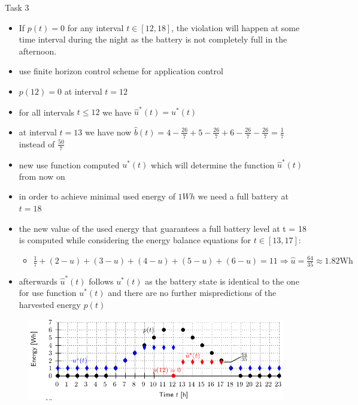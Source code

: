 \begin{frame}[allowframebreaks]{Task 3}{}
\begin{solution}
\begin{itemize}
      \item If $p(t)=0$ for any interval $t \in[12,18]$, the violation will happen at some time interval during the night as the battery is not completely full in the afternoon.
    \end{itemize}
  \end{solution}
  \framebreak
  \begin{tasknoinc}
    \begin{itemize}
      \item use finite horizon control scheme for application control
      \item $p(12) = 0$ at interval $t = 12$
    \end{itemize}
  \end{tasknoinc}
  \begin{solutionnoinc}
    \begin{itemize}
      \item for all intervals $t\le 12$ we have $\hat u^*(t) = u^*(t)$
      \item at interval $t=13$ we have now $\hat b(t)= 4 - \frac{26}{7} + 5 - \frac{26}{7} + 6 - \frac{26}{7} - \frac{26}{7} =\frac{1}{7}$ instead of $\frac{50}{7}$
      \item new use function computed $u^*(t)$ which will determine the function $\hat u^*(t)$ from now on
      \item in order to achieve minimal used energy of $1Wh$ we need a full battery at $t=18$
      \item the new value of the used energy that guarantees a full battery level at t = 18 is computed while considering the energy balance equations for $t\in [13, 17]$:
      \begin{itemize}
        \item $\frac{1}{7}+(2-u)+(3-u)+(4-u)+(5-u)+(6-u)=11 \Rightarrow \hat{u}=\frac{64}{35} \approx 1.82 \mathrm{Wh}$
      \end{itemize}
      \item afterwards $\hat u^*(t)$ follows $u^*(t)$ as the battery state is identical to the one for use function $u^*(t)$ and there are no further mispredictions of the harvested energy $p(t)$
    \end{itemize}
  \end{solutionnoinc}
  \framebreak
  \begin{solutionnoinc}
    \begin{figure}
      \centering
      \includegraphics[width=\textwidth]{./figures/task5_use_and_harvest.png}

\end{figure}
\end{solutionnoinc}
\end{frame}
